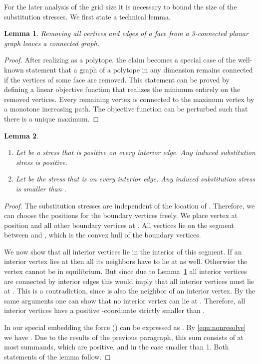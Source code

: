 \documentclass{article}
\theoremstyle{plain} \newtheorem{thm}{Theorem}[section]
\newtheorem{lem}{Lemma}[section]
\begin{document}
For the later analysis of the grid size it is necessary to bound the
size of the substitution stresses. We first state a technical lemma.
\begin{lem}\label{lem:technical}
  Removing all vertices and edges of a face  from a 3-connected
  planar graph  leaves a connected graph.
\end{lem}
\begin{proof}
  After realizing  as a polytope, the
  claim becomes a special case of the well-known statement that a graph of a
  polytope in any dimension remains connected if the vertices of some
  face are removed. This statement can be proved by defining a linear
  objective function that realizes the minimum entirely on the removed
  vertices. Every remaining vertex is connected to the maximum vertex
  by a monotone increasing path.  The objective function
  can be perturbed such that there is a unique maximum.
\end{proof}
\begin{lem} \label{lem:2}
\begin{enumerate}
\item Let  be a stress that is positive on every interior edge. Any induced substitution stress  is positive.
\item Let  be the stress that is  on every interior edge. Any induced substitution stress  is smaller than .
\end{enumerate}
\end{lem}
\begin{proof}
The substitution stresses are independent of the location of . 
Therefore, we can choose the positions for 
the boundary vertices freely.
We place vertex  at position  and all other boundary vertices at .
All vertices lie on the segment between  and , which is the convex hull of the boundary vertices. 

We now show that all interior vertices lie in the interior of this
segment.
If an interior vertex lies at  then all its neighbors have to lie at  as well. Otherwise the vertex cannot be in equilibrium. But since due to Lemma~\ref{lem:technical} all interior vertices are connected by interior edges this would imply that all interior vertices must lie at . This is a contradiction, since  is also the neighbor of an interior vertex. By the same arguments one can show that no interior vertex can lie at . 
Therefore, all interior vertices have a positive -coordinate strictly smaller than .

In our special embedding the force  () can be expressed as .
By \eqref{equ:nonresolve} we 
have . 
Due to the results of the previous paragraph, this sum consists of at most   summands, which are positive, and in the case  smaller than 1. Both statements of the lemma follow.
\end{proof}
\end{document}
